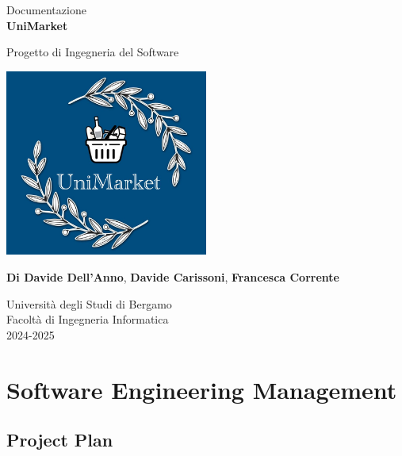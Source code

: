 \documentclass[a4paper,12pt]{article}
\begin{document}
\begin{titlepage}
    \centering
    \vspace*{2cm}
    
    \vspace{1.5cm}
    
    \large Documentazione\\
    \Huge
    \textbf{UniMarket}
    
    \vspace{1.5cm}
    
    \LARGE
    Progetto di Ingegneria del Software
    
    \vspace{1.5cm}
    \includegraphics[width=0.5\textwidth]{../Media/logo.jpeg}
    
    \vspace{1.5cm}
    \small
    \textbf{Di Davide Dell'Anno}, \textbf{Davide Carissoni}, \textbf{Francesca Corrente}
    
    \vspace{1.5cm}
    
    \Large
    Università degli Studi di Bergamo \\
    Facoltà di Ingegneria Informatica \\
    2024-2025
    
\end{titlepage}

\renewcommand{\contentsname}{Indice}
\newpage
\tableofcontents
\newpage

\section{Software Engineering Management}
\subsection{Project Plan}
\end{document}
